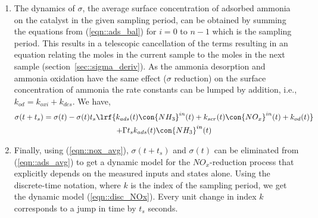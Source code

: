 \begin{enumerate}
                \begin{multline}
                        \underbrace{\con{NO_x}^{out}}_{x_1(t+t_s)}(t + t_s) =
                                \underbrace{\con{NO_x}^{in}}_{u_1(t)}(t) - \tau(t) k_{s2v} k_{scr}(t) \con{NO_x}^{in}(t) \underbrace{\lrf{\frac{1}{n} \sum_{i = 0}^{n-1} \con{NH_3}^{ads}(t + i \tau)}}_{\sigma(t)}
                        \label{eqn::nox_avg}
                \end{multline}

        \item The dynamics of $\sigma$, the average surface concentration of adsorbed ammonia on the catalyst in the
                given sampling period, can be obtained by summing the equations from (\ref{eqn::ads_bal}) for $i = 0$ to
                $n-1$ which is the sampling period. This results in a telescopic cancellation of the terms resulting in
                an equation relating the moles in the current sample to the moles in the next sample
                (section~\ref{sec::sigma_deriv}). As the ammonia desorption and ammonia oxidation have the same effect
                ($\sigma$ reduction) on the surface concentration of ammonia the rate constants can
                be lumped by addition, i.e., $k_{od} = k_{oxi} + k_{des}$. We have,
                \begin{multline}
                        \sigma(t + t_s) = \sigma(t) - \sigma(t) t_s \lrf{k_{ads}(t) \con{NH_3}^{in}(t)
                                                                                + k_{scr}(t) \con{NO_x}^{in}(t)
                                                                                + k_{od}(t)}
                                                \\
                                                + \Gamma t_s k_{ads}(t) \con{NH_3}^{in}(t)
                        \label{eqn::ads_avg}
                \end{multline}
        \item Finally, using (\ref{eqn::nox_avg}), $\sigma(t+t_s)$ and $\sigma(t)$ can be eliminated from
                (\ref{eqn::ads_avg}) to get a dynamic model for the $NO_x$-reduction process that explicitly depends on
                the measured inputs and states alone. Using the discrete-time notation, where $k$ is the index of the
                sampling period, we get the dynamic model (\ref{eqn::disc_NOx}). Every unit change in index $k$
                corresponds to a jump in time by $t_s$ seconds.
                \begin{align}

\end{align}
\end{enumerate}
